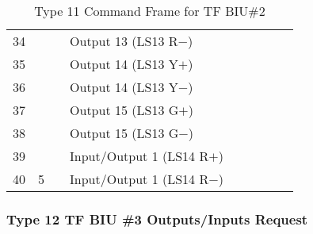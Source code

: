 \documentclass[]{article}
\begin{document}
\begin{landscape}
\begin{table}[ht]
\begin{tabular}{lllllllll}
			34           &                     &                    & Output 13 (LS13 R$-$)          &                    & \cellcolor[HTML]{C0C0C0} & \cellcolor[HTML]{C0C0C0}                   & \cellcolor[HTML]{C0C0C0}                   & \cellcolor[HTML]{C0C0C0}                  \\
			35           &                     &                    & Output 14 (LS13 Y$+$)          &                    & \cellcolor[HTML]{C0C0C0} & \cellcolor[HTML]{C0C0C0}                   & \cellcolor[HTML]{C0C0C0}                   & \cellcolor[HTML]{C0C0C0}                  \\
			36           &                     &                    & Output 14 (LS13 Y$-$)          &                    & \cellcolor[HTML]{C0C0C0} & \cellcolor[HTML]{C0C0C0}                   & \cellcolor[HTML]{C0C0C0}                   & \cellcolor[HTML]{C0C0C0}                  \\
			37           &                     &                    & Output 15 (LS13 G$+$)          &                    & \cellcolor[HTML]{C0C0C0} & \cellcolor[HTML]{C0C0C0}                   & \cellcolor[HTML]{C0C0C0}                   & \cellcolor[HTML]{C0C0C0}                  \\
			38           &                     &                    & Output 15 (LS13 G$-$)          &                    & \cellcolor[HTML]{C0C0C0} & \cellcolor[HTML]{C0C0C0}                   & \cellcolor[HTML]{C0C0C0}                   & \cellcolor[HTML]{C0C0C0}                  \\
			39           &                     &                    & Input/Output 1 (LS14 R$+$)     &                    & \cellcolor[HTML]{C0C0C0} & \cellcolor[HTML]{C0C0C0}                   & \cellcolor[HTML]{C0C0C0}                   & \cellcolor[HTML]{C0C0C0}                  \\
			40           & \multirow{-8}{*}{5} & \multirow{-8}{*}{} & Input/Output 1 (LS14 R$-$)     &                    & \cellcolor[HTML]{C0C0C0} & \multirow{-8}{*}{\cellcolor[HTML]{C0C0C0}} & \multirow{-8}{*}{\cellcolor[HTML]{C0C0C0}} & \cellcolor[HTML]{C0C0C0}                  \\ \cline{1-4} \cline{6-9} 
		\end{tabular}%

	\caption{Type 11 Command Frame for TF BIU\#2}
	\label{tab:type-11-frame}
\end{table}
\end{landscape}
\clearpage

\subsubsection {Type 12 TF BIU \#3 Outputs/Inputs Request}
\end{document}
